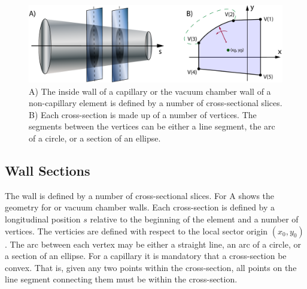 
\begin{figure}[tb]
  \centering
  \includegraphics[width=6in]{chamber-wall.pdf}
  \caption[Capillary or vacuum chamber wall.]
{A) The inside wall of a capillary or the vacuum chamber wall of a
non-capillary element is defined by a number of cross-sectional
slices.  B) Each cross-section is made up of a number of vertices. The
segments between the vertices can be either a line segment, the arc of
a circle, or a section of an ellipse.}
  \label{f:chamber.wall}
\end{figure}

\subsection{Wall Sections}
\label{s:wall.section}

The wall is defined by a number of cross-sectional slices. For
A shows the geometry for  or vacuum
chamber walls.  Each cross-section is defined by a longitudinal
position $s$ relative to the beginning of the element and a number of
vertices. The verticies are defined with respect to the local sector
origin $(x_0, y_0)$. The arc between each vertex may be either a
straight line, an arc of a circle, or a section of an ellipse. For a
capillary it is mandatory that a cross-section be convex. That is,
given any two points within the cross-section, all points on the line
segment connecting them must be within the cross-section.

